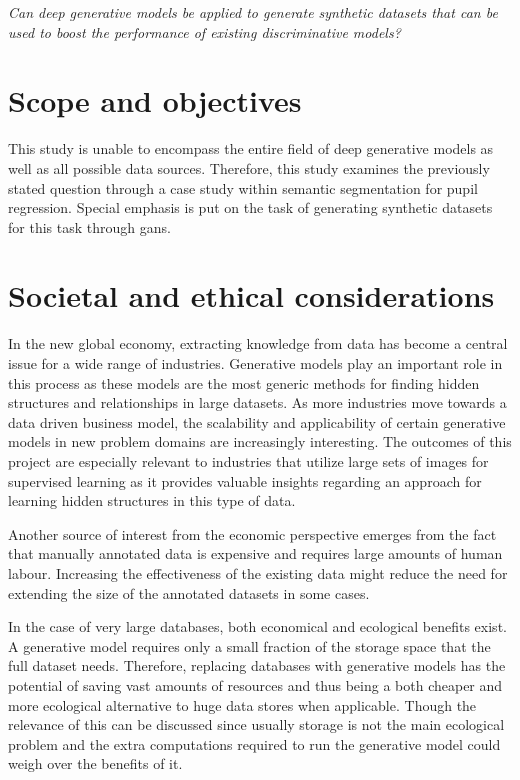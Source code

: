 \begin{framed}
    \textit{Can deep generative models be applied to generate synthetic datasets that can be used to boost the performance of existing discriminative models?} 
\end{framed}


\section{Scope and objectives}
This study is unable to encompass the entire field of deep generative models as well as all possible data sources. Therefore, this study examines the previously stated question through a case study within semantic segmentation for pupil regression. Special emphasis is put on the task of generating synthetic datasets for this task through \acrlong{gans}.

\section{Societal and ethical considerations}
In the new global economy, extracting knowledge from data has become a central issue for a wide range of industries. Generative models play an important role in this process as these models are the most generic methods for finding hidden structures and relationships in large datasets. As more industries move towards a data driven business model, the scalability and applicability of certain generative models in new problem domains are increasingly interesting. The outcomes of this project are especially relevant to industries that utilize large sets of images for supervised learning as it provides valuable insights regarding an approach for learning hidden structures in this type of data.

Another source of interest from the economic perspective emerges from the fact that manually annotated data is expensive and requires large amounts of human labour. Increasing the effectiveness of the existing data might reduce the need for extending the size of the annotated datasets in some cases. 

In the case of very large databases, both economical and ecological benefits exist. A generative model requires only a small fraction of the storage space that the full dataset needs. Therefore, replacing databases with generative models has the potential of saving vast amounts of resources and thus being a both cheaper and more ecological alternative to huge data stores when applicable. Though the relevance of this can be discussed since usually storage is not the main ecological problem and the extra computations required to run the generative model could weigh over the benefits of it.

